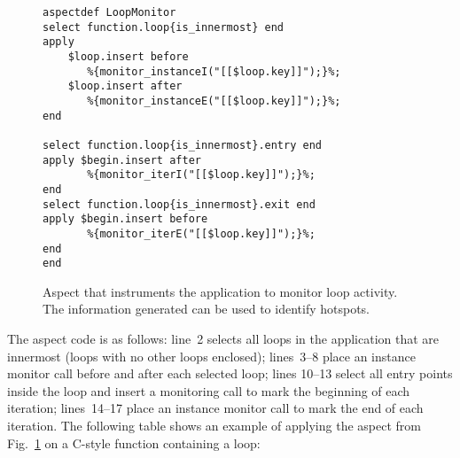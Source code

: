 \lstset{style=lara}
\begin{figure}[!h]
\begin{lstlisting}
aspectdef LoopMonitor
select function.loop{is_innermost} end
apply
    $loop.insert before
       %{monitor_instanceI("[[$loop.key]]");}%;
    $loop.insert after
       %{monitor_instanceE("[[$loop.key]]");}%;
end

select function.loop{is_innermost}.entry end
apply $begin.insert after
       %{monitor_iterI("[[$loop.key]]");}%;
end
select function.loop{is_innermost}.exit end
apply $begin.insert before
       %{monitor_iterE("[[$loop.key]]");}%;
end
end
\end{lstlisting}
\caption{Aspect that instruments the application to monitor loop
  activity. The information generated can be used to identify
  hotspots.}
\label{fig:hotspot}
\end{figure}

  The aspect code is as follows: line~2 selects all
loops in the application that are innermost (loops with no other loops
enclosed); lines~3--8 place an instance monitor call before and after
each selected loop; lines 10--13 select all entry points inside the
loop and insert a monitoring call to mark the beginning of each
iteration; lines~14--17 place an instance monitor call to mark the end
of each iteration. The following table shows an example of applying
the aspect from Fig.~\ref{fig:hotspot} on a C-style function containing a loop:
\vspace{2mm}


